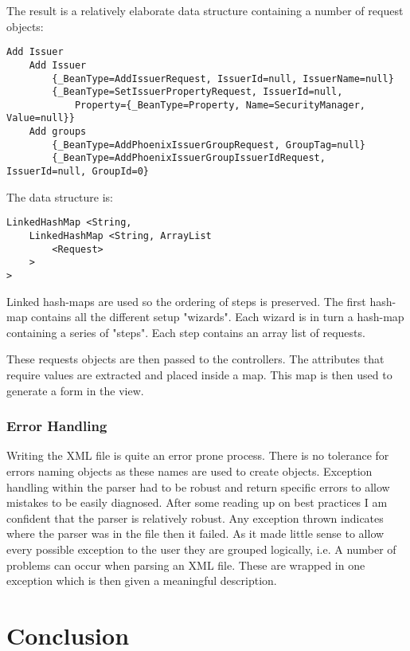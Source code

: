 \documentclass[a4paper, 11pt, titlepage]{article}
\begin{document}
The result is a relatively elaborate data structure containing a number of request objects: 
 
\begin{verbatim} 
Add Issuer 
    Add Issuer 
        {_BeanType=AddIssuerRequest, IssuerId=null, IssuerName=null} 
        {_BeanType=SetIssuerPropertyRequest, IssuerId=null, 
            Property={_BeanType=Property, Name=SecurityManager, Value=null}} 
    Add groups 
        {_BeanType=AddPhoenixIssuerGroupRequest, GroupTag=null} 
        {_BeanType=AddPhoenixIssuerGroupIssuerIdRequest, IssuerId=null, GroupId=0} 
\end{verbatim} 
 
The data structure is: 
 
\begin{verbatim} 
LinkedHashMap <String,  
    LinkedHashMap <String, ArrayList 
        <Request> 
    > 
> 
\end{verbatim} 
 
Linked hash-maps are used so the ordering of steps is preserved. The first hash-map contains all the different setup "wizards". Each wizard is in turn a hash-map containing a series of "steps". Each step contains an array list of requests.

These requests objects are then passed to the controllers. The attributes that require values are extracted and placed inside a map. This map is then used to generate a form in the view.
\subsubsection{Error Handling} 
 
Writing the XML file is quite an error prone process. There is no tolerance for errors naming objects as these names are used to create objects. Exception handling within the parser had to be robust and return specific errors to allow mistakes to be easily diagnosed. After some reading up on best practices I am confident that the parser is relatively robust. Any exception thrown indicates where the parser was in the file then it failed. As it made little sense to allow every possible exception to the user they are grouped logically, i.e. A number of problems can occur when parsing an XML file. These are wrapped in one exception which is then given a meaningful description. \cite{RobustJava}

 
\section{Conclusion} 
 
\end{document}
